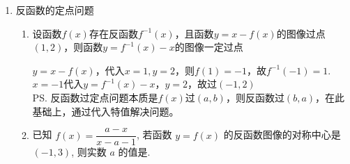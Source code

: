 \begin{enumerate}
\begin{enumerate}
\begin{enumerate}
\begin{jieda}
                故$x = -1$或$log_312$.
            \end{jieda}
        \end{enumerate}
        \item 换底
        \begin{enumerate}
            \item $9^x + 4^x = \dfrac{5}{2} \cdot 6^x$
            \begin{jieda}
                原方程等价于$(\dfrac{3}{2})^x + (\dfrac{2}{3})^x = \dfrac{5}{2}$，换元$t = (\dfrac{3}{2})^x, t > 0$，故$t + \dfrac{1}{t} = \dfrac{5}{2}$，故$t = 2$或$\dfrac{1}{2}$，故$x = log_{\frac{3}{2}}2$或$-log_{\frac{3}{2}}2$
            \end{jieda}
            \item $3^x + 4^x = 5^x$
            \begin{jieda}
                原方程等价于$(\dfrac{3}{5})^x + (\dfrac{4}{5})^x = 1$ \\
                因为$y = (\dfrac{3}{5})^x + (\dfrac{4}{5})^x $单调递减，因此原方程只有一根$x = 2$
            \end{jieda}
            \item $2 \cdot x^{lg2} \cdot 2^{lgx} - 7x^{lg2} - 4 = 0$
            \begin{jieda}
                首先统一底数有$2 \cdot x^{lg2} \cdot x^{lg2} - 7x^{lg2} - 4 = 0$ \\
                换元$t = x^{lg2} = 2^{lgx}, t > 0$，因此$2t^2-7t-4 = 0$，解得$t = 4$或$-\dfrac{1}{2}$（舍）\\
                故$x = 100$
            \end{jieda}
        \end{enumerate}
    \end{enumerate}
    \item 反函数的定点问题
    \begin{enumerate}
        \item 设函数$f(x)$存在反函数$f^{-1}(x)$，且函数$y = x - f(x)$的图像过点$(1, 2)$，则函数$y = f^{-1}(x) - x$的图像一定过点
        \begin{jieda}
            $y = x - f(x)$，代入$x = 1, y = 2$，则$f(1) = -1$，故$f^{-1}(-1) = 1$. $x = -1$代入$y = f^{-1}(x) - x$，$y = 2$，故过$(-1, 2)$ \\
            \ps 反函数过定点问题本质是$f(x)$过$(a, b)$，则反函数过$(b, a)$，在此基础上，通过代入特值解决问题。
        \end{jieda}
        \item 已知 $f(x)=\dfrac{a-x}{x-a-1}$, 若函数 $y=f(x)$ 的反函数图像的对称中心是 $(-1,3)$, 则实数 $a$ 的值是.

\end{enumerate}
\end{enumerate}
